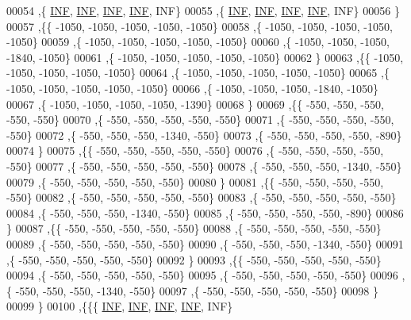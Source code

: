 \begin{DoxyCode}
00054   ,\{   \hyperlink{energy__const_8h_a12c2040f25d8e3a7b9e1c2024c618cb6}{INF},   \hyperlink{energy__const_8h_a12c2040f25d8e3a7b9e1c2024c618cb6}{INF},   \hyperlink{energy__const_8h_a12c2040f25d8e3a7b9e1c2024c618cb6}{INF},   \hyperlink{energy__const_8h_a12c2040f25d8e3a7b9e1c2024c618cb6}{INF},   INF\}
00055   ,\{   \hyperlink{energy__const_8h_a12c2040f25d8e3a7b9e1c2024c618cb6}{INF},   \hyperlink{energy__const_8h_a12c2040f25d8e3a7b9e1c2024c618cb6}{INF},   \hyperlink{energy__const_8h_a12c2040f25d8e3a7b9e1c2024c618cb6}{INF},   \hyperlink{energy__const_8h_a12c2040f25d8e3a7b9e1c2024c618cb6}{INF},   INF\}
00056   \}
00057  ,\{\{ -1050, -1050, -1050, -1050, -1050\}
00058   ,\{ -1050, -1050, -1050, -1050, -1050\}
00059   ,\{ -1050, -1050, -1050, -1050, -1050\}
00060   ,\{ -1050, -1050, -1050, -1840, -1050\}
00061   ,\{ -1050, -1050, -1050, -1050, -1050\}
00062   \}
00063  ,\{\{ -1050, -1050, -1050, -1050, -1050\}
00064   ,\{ -1050, -1050, -1050, -1050, -1050\}
00065   ,\{ -1050, -1050, -1050, -1050, -1050\}
00066   ,\{ -1050, -1050, -1050, -1840, -1050\}
00067   ,\{ -1050, -1050, -1050, -1050, -1390\}
00068   \}
00069  ,\{\{  -550,  -550,  -550,  -550,  -550\}
00070   ,\{  -550,  -550,  -550,  -550,  -550\}
00071   ,\{  -550,  -550,  -550,  -550,  -550\}
00072   ,\{  -550,  -550,  -550, -1340,  -550\}
00073   ,\{  -550,  -550,  -550,  -550,  -890\}
00074   \}
00075  ,\{\{  -550,  -550,  -550,  -550,  -550\}
00076   ,\{  -550,  -550,  -550,  -550,  -550\}
00077   ,\{  -550,  -550,  -550,  -550,  -550\}
00078   ,\{  -550,  -550,  -550, -1340,  -550\}
00079   ,\{  -550,  -550,  -550,  -550,  -550\}
00080   \}
00081  ,\{\{  -550,  -550,  -550,  -550,  -550\}
00082   ,\{  -550,  -550,  -550,  -550,  -550\}
00083   ,\{  -550,  -550,  -550,  -550,  -550\}
00084   ,\{  -550,  -550,  -550, -1340,  -550\}
00085   ,\{  -550,  -550,  -550,  -550,  -890\}
00086   \}
00087  ,\{\{  -550,  -550,  -550,  -550,  -550\}
00088   ,\{  -550,  -550,  -550,  -550,  -550\}
00089   ,\{  -550,  -550,  -550,  -550,  -550\}
00090   ,\{  -550,  -550,  -550, -1340,  -550\}
00091   ,\{  -550,  -550,  -550,  -550,  -550\}
00092   \}
00093  ,\{\{  -550,  -550,  -550,  -550,  -550\}
00094   ,\{  -550,  -550,  -550,  -550,  -550\}
00095   ,\{  -550,  -550,  -550,  -550,  -550\}
00096   ,\{  -550,  -550,  -550, -1340,  -550\}
00097   ,\{  -550,  -550,  -550,  -550,  -550\}
00098   \}
00099  \}
00100 ,\{\{\{   \hyperlink{energy__const_8h_a12c2040f25d8e3a7b9e1c2024c618cb6}{INF},   \hyperlink{energy__const_8h_a12c2040f25d8e3a7b9e1c2024c618cb6}{INF},   \hyperlink{energy__const_8h_a12c2040f25d8e3a7b9e1c2024c618cb6}{INF},   \hyperlink{energy__const_8h_a12c2040f25d8e3a7b9e1c2024c618cb6}{INF},   INF\}

\end{DoxyCode}
